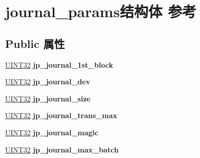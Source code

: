 \hypertarget{structjournal__params}{}\section{journal\+\_\+params结构体 参考}
\label{structjournal__params}
\subsection*{Public 属性}
\begin{DoxyCompactItemize}
\item 
\mbox{\label{structjournal__params_a1d34edfd91d977866d52e7a166baabd5}} 
\hyperlink{_processor_bind_8h_ae1e6edbbc26d6fbc71a90190d0266018}{U\+I\+N\+T32} {\bfseries jp\+\_\+journal\+\_\+1st\+\_\+block}
\item 
\mbox{\label{structjournal__params_abdd6092589166e3ef31870fdda6f5c72}} 
\hyperlink{_processor_bind_8h_ae1e6edbbc26d6fbc71a90190d0266018}{U\+I\+N\+T32} {\bfseries jp\+\_\+journal\+\_\+dev}
\item 
\mbox{\label{structjournal__params_adf5393f92e0c608ffa2ed62b240a9af5}} 
\hyperlink{_processor_bind_8h_ae1e6edbbc26d6fbc71a90190d0266018}{U\+I\+N\+T32} {\bfseries jp\+\_\+journal\+\_\+size}
\item 
\mbox{\label{structjournal__params_ab9cf9078ada26f582be6fd05f22de63d}} 
\hyperlink{_processor_bind_8h_ae1e6edbbc26d6fbc71a90190d0266018}{U\+I\+N\+T32} {\bfseries jp\+\_\+journal\+\_\+trans\+\_\+max}
\item 
\mbox{\label{structjournal__params_a83af8a356f15b5633cc551bc6044f132}} 
\hyperlink{_processor_bind_8h_ae1e6edbbc26d6fbc71a90190d0266018}{U\+I\+N\+T32} {\bfseries jp\+\_\+journal\+\_\+magic}
\item 
\mbox{\label{structjournal__params_ae0888bfcaad20b1e6015d1b28a11b8cb}} 
\hyperlink{_processor_bind_8h_ae1e6edbbc26d6fbc71a90190d0266018}{U\+I\+N\+T32} {\bfseries jp\+\_\+journal\+\_\+max\+\_\+batch}
\item 
\mbox{\label{structjournal__params_a9568d217308943d8aaac625ca49aa12b}} 

\end{DoxyCompactItemize}
